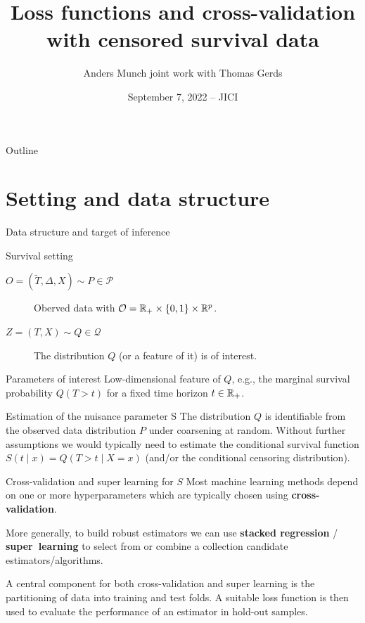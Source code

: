 \documentclass[smaller]{beamer}\usepackage{listings}
\institute{PhD Student, Section of Biostatistics \\ University of Copenhagen}
\author{Anders Munch \newline \small joint work with Thomas Gerds}
\date{September 7, 2022 -- JICI}
\title{Loss functions and cross-validation with censored survival data}
\begin{document}
\maketitle
\begin{frame}{Outline}
\tableofcontents
\end{frame}

\section{Setting and data structure}
\label{sec:orga5b0c20}
\begin{frame}[label={sec:orgecba2dd}]{Data structure and target of inference}
\small
\begin{block}{Survival setting}
\begin{description}
\item[{\(O = (\tilde T, \Delta, X) \sim P \in \mathcal{P}\)}] Oberved data with \(\mathcal{O} = \mathbb{R}_+
  \times \{0,1\} \times \mathbb{R}^p\).
\item[{\(Z = (T, X) \sim Q \in \mathcal{Q}\)}] The distribution \(Q\) (or a feature of it) is of interest.
\end{description}

\hfill \pause
\end{block}

\begin{block}{Parameters of interest}
Low-dimensional feature of \(Q\), e.g., the marginal survival probability \(Q(T > t)\) for a fixed
time horizon \(t \in \mathbb{R}_+\).

\hfill 
\end{block}


\begin{block}{Estimation of the nuisance parameter S}
The distribution \(Q\) is identifiable from the observed data distribution \(P\) under coarsening at
random. Without further assumptions we would typically need to estimate the conditional survival
function \(S(t \mid x) = Q(T > t \mid X=x)\) (and/or the conditional censoring distribution).
\end{block}
\end{frame}

\begin{frame}[label={sec:orgcceeb5b}]{Cross-validation and super learning for \(S\)}
\pause Most machine learning methods depend on one or more hyperparameters which are typically
chosen using \textbf{cross-validation}.

\vfill

More generally, to build robust estimators we can use \textbf{stacked regression} /
\textbf{super~learning} \citep{breiman1996stacked,van2007super} to select from or combine a
collection candidate estimators/algorithms.

\vfill

A central component for both cross-validation and super learning is the partitioning of data into
training and test folds. A suitable loss function is then used to evaluate the performance of an
estimator in hold-out samples.
\end{frame}
\end{document}
